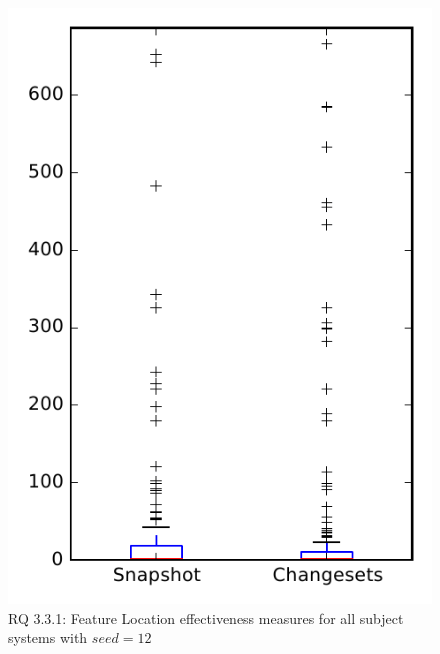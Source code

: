 
\begin{figure}
\centering
\includegraphics[height=0.4\textheight]{figures/flt_seed/rq1_overview_12}
\caption{RQ 3.3.1: Feature Location effectiveness measures for all subject systems with $seed=12$}
\label{fig:flt_seed:rq1:overview}
\end{figure}
